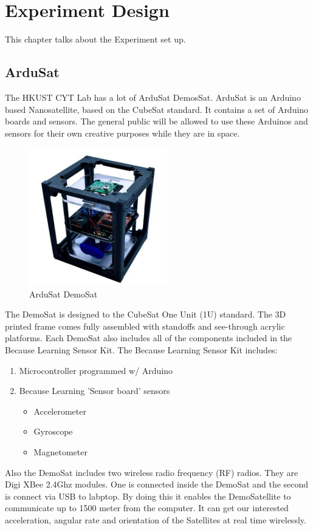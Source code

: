 \chapter{Experiment Design}\label{sec-DOE}
This chapter talks about the Experiment set up.
\section{ArduSat}
The HKUST CYT Lab has a lot of ArduSat DemosSat. ArduSat is an Arduino based Nanosatellite, based on the CubeSat standard. It contains a set of Arduino boards and sensors. The general public will be allowed to use these Arduinos and sensors for their own creative purposes while they are in space. 
\begin{figure}[ht]
\centering
\includegraphics[width=6cm]{fig/DOE/Demosat}
\caption{ArduSat DemoSat}
\end{figure}
The DemoSat is designed to the CubeSat One Unit (1U) standard. The 3D printed frame comes fully assembled with standoffs and see-through acrylic platforms. Each DemoSat also includes all of the components included in the Because Learning Sensor Kit. The Because Learning Sensor Kit includes:
\begin{enumerate}
\item Microcontroller programmed w/ Arduino 
\item Because Learning 'Sensor board' sensors 
\begin{itemize}
\item Accelerometer
\item Gyroscope
\item Magnetometer
\end{itemize}
\end{enumerate} 
Also the DemoSat includes two wireless radio frequency (RF) radios. They are Digi XBee 2.4Ghz modules. One is connected inside the DemoSat and the second is connect via USB to labptop. By doing this it enables the DemoSatellite to communicate up to 1500 meter from the computer.
It can get our interested acceleration, angular rate and orientation of the Satellites at real time wirelessly.
